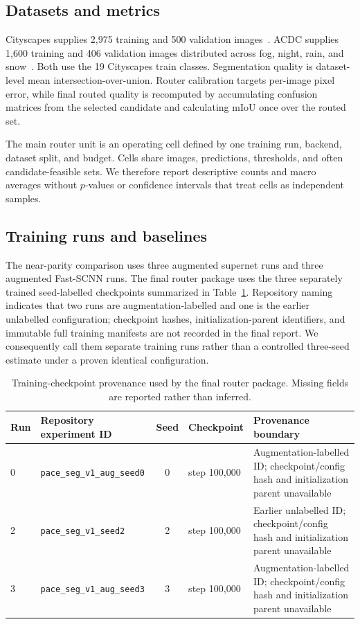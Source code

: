 \documentclass[a4paper,review,12pt]{elsarticle}
\newcommand{\miou}{mIoU}
\begin{document}
\subsection{Datasets and metrics}

Cityscapes supplies 2,975 training and 500 validation images~\cite{cordts2016cityscapes}. ACDC supplies 1,600 training and 406 validation images distributed across fog, night, rain, and snow~\cite{sakaridis2021acdc}. Both use the 19 Cityscapes train classes. Segmentation quality is dataset-level mean intersection-over-union. Router calibration targets per-image pixel error, while final routed quality is recomputed by accumulating confusion matrices from the selected candidate and calculating \miou{} once over the routed set.

The main router unit is an operating cell defined by one training run, backend, dataset split, and budget. Cells share images, predictions, thresholds, and often candidate-feasible sets. We therefore report descriptive counts and macro averages without $p$-values or confidence intervals that treat cells as independent samples.

\subsection{Training runs and baselines}

The near-parity comparison uses three augmented supernet runs and three augmented Fast-SCNN runs. The final router package uses the three separately trained seed-labelled checkpoints summarized in Table~\ref{tab:provenance}. Repository naming indicates that two runs are augmentation-labelled and one is the earlier unlabelled configuration; checkpoint hashes, initialization-parent identifiers, and immutable full training manifests are not recorded in the final report. We consequently call them separate training runs rather than a controlled three-seed estimate under a proven identical configuration.

\begin{table}[t]
\centering
\caption{Training-checkpoint provenance used by the final router package. Missing fields are reported rather than inferred.}
\label{tab:provenance}
\small
\begin{tabularx}{\textwidth}{@{}lXclX@{}}
\toprule
Run & Repository experiment ID & Seed & Checkpoint & Provenance boundary \\
\midrule
0 & \texttt{pace\_seg\_v1\_aug\_seed0} & 0 & step 100,000 & Augmentation-labelled ID; checkpoint/config hash and initialization parent unavailable \\
2 & \texttt{pace\_seg\_v1\_seed2} & 2 & step 100,000 & Earlier unlabelled ID; checkpoint/config hash and initialization parent unavailable \\
3 & \texttt{pace\_seg\_v1\_aug\_seed3} & 3 & step 100,000 & Augmentation-labelled ID; checkpoint/config hash and initialization parent unavailable \\
\bottomrule
\end{tabularx}
\end{table}
\end{document}
